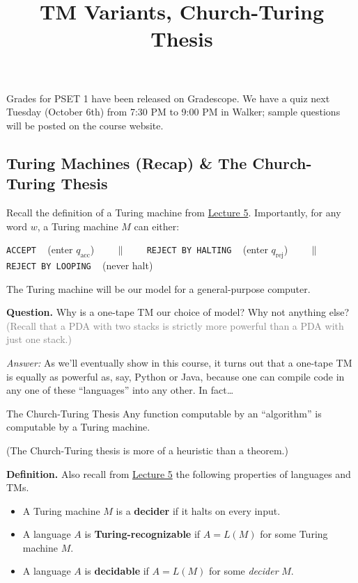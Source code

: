 \title{TM Variants, Church-Turing Thesis}



Grades for PSET 1 have been released on Gradescope.
We have a quiz next Tuesday (October 6th) from 7:30 PM to 9:00 PM in Walker;
sample questions will be posted on the course website.

\subsection{Turing Machines (Recap) \& The Church-Turing Thesis}

Recall the definition of a Turing machine from
\href{/18.404/lectures/5/#turing-machines}{Lecture 5}.
Importantly, for any word $w$, a Turing machine $M$ can either:
\begin{center}
    \texttt{ACCEPT} ~ (enter $q_{\mathrm{acc}}$)
    ~~~ $\parallel$ ~~~
    \texttt{REJECT BY HALTING} ~ (enter $q_{\mathrm{rej}}$)
    ~~~ $\parallel$ ~~~
    \texttt{REJECT BY LOOPING} ~ (never halt)
\end{center}
The Turing machine will be our model for a general-purpose computer.

\textbf{Question.}
Why is a one-tape TM our choice of model?
Why not anything else? \\
\textcolor{grey}{(Recall that a PDA with two stacks is strictly more powerful
than a PDA with just one stack.)}

\emph{Answer:}
As we'll eventually show in this course,
it turns out that a one-tape TM
is equally as powerful as, say, Python or Java,
because one can compile code in any one of these ``languages''
into any other.  In fact\dots

\begin{theorem}{The Church-Turing Thesis}
    Any function computable by an ``algorithm''
    is computable by a Turing machine.
\end{theorem}

(The Church-Turing thesis is more of a heuristic than a theorem.)

\textbf{Definition.}
Also recall from \href{/18.404/lectures/5/#turing-machines}{Lecture 5}
the following properties of languages and TMs.
\begin{itemize}
    \item A Turing machine $M$ is a \textbf{decider}
    if it halts on every input.
    \item A language $A$ is \textbf{Turing-recognizable}
    if $A = L(M)$ for some Turing machine $M$.
    \item A language $A$ is \textbf{decidable}
    if $A = L(M)$ for some \emph{decider} $M$.
\end{itemize}

